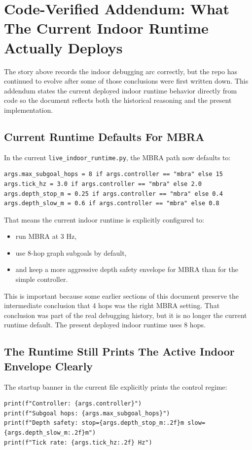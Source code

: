 \documentclass[11pt]{article}
\begin{document}
\section{Code-Verified Addendum: What The Current Indoor Runtime Actually Deploys}

The story above records the indoor debugging arc correctly, but the repo has continued to evolve after some of those conclusions were first written down. This addendum states the current deployed indoor runtime behavior directly from code so the document reflects both the historical reasoning and the present implementation.

\subsection{Current Runtime Defaults For MBRA}
In the current \texttt{live\_indoor\_runtime.py}, the MBRA path now defaults to:
\begin{lstlisting}
args.max_subgoal_hops = 8 if args.controller == "mbra" else 15
args.tick_hz = 3.0 if args.controller == "mbra" else 2.0
args.depth_stop_m = 0.25 if args.controller == "mbra" else 0.4
args.depth_slow_m = 0.6 if args.controller == "mbra" else 0.8
\end{lstlisting}

That means the current indoor runtime is explicitly configured to:
\begin{itemize}
\item run MBRA at 3 Hz,
\item use 8-hop graph subgoals by default,
\item and keep a more aggressive depth safety envelope for MBRA than for the simple controller.
\end{itemize}

This is important because some earlier sections of this document preserve the intermediate conclusion that 4 hops was the right MBRA setting. That conclusion was part of the real debugging history, but it is no longer the current runtime default. The present deployed indoor runtime uses 8 hops.

\subsection{The Runtime Still Prints The Active Indoor Envelope Clearly}
The startup banner in the current file explicitly prints the control regime:
\begin{lstlisting}
print(f"Controller: {args.controller}")
print(f"Subgoal hops: {args.max_subgoal_hops}")
print(f"Depth safety: stop={args.depth_stop_m:.2f}m slow={args.depth_slow_m:.2f}m")
print(f"Tick rate: {args.tick_hz:.2f} Hz")
\end{lstlisting}
\end{document}
